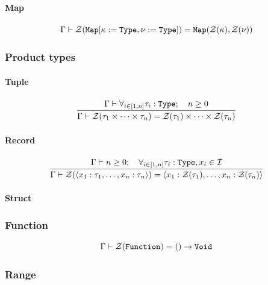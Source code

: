 \paragraph{Map}

\[
	\Gamma\vdash \mathcal{Z}(\texttt{Map}[\kappa:=\texttt{Type},\nu:=\texttt{Type}]) = \texttt{Map}(\mathcal{Z}(\kappa), \mathcal{Z}(\nu))
\]

\subsubsection{Product types}


\paragraph{Tuple}

\[
	\frac{\begin{gathered}
		\Gamma\vdash \forall_{i\in[1,n]}{\tau_i:\texttt{Type}} ;\quad n \geq 0
	\end{gathered}}{\begin{gathered}
		\Gamma\vdash \mathcal{Z}(\tau_1 \times \dotsb \times \tau_n) = \mathcal{Z}(\tau_1) \times \dotsb \times \mathcal{Z}(\tau_n)
	\end{gathered}}
\]

\paragraph{Record}

\[
	\frac{\begin{gathered}
		\Gamma\vdash n \geq 0 ;\quad \forall_{i\in[1,n]}{\tau_i:\texttt{Type}, x_i \in \mathcal{I}}
	\end{gathered}}{\begin{gathered}
		\Gamma\vdash \mathcal{Z}(\left<x_1:\tau_1,\dotsc,x_n:\tau_n\right>) = \left<x_1:\mathcal{Z}(\tau_1), \dotsc, x_n:\mathcal{Z}(\tau_n)\right>
	\end{gathered}}
\]

\paragraph{Struct}

\text{}


\subsubsection{Function}

\[
	\Gamma\vdash \mathcal{Z}(\texttt{Function}) = ()\to\texttt{Void}
\]


\subsubsection{Range}

